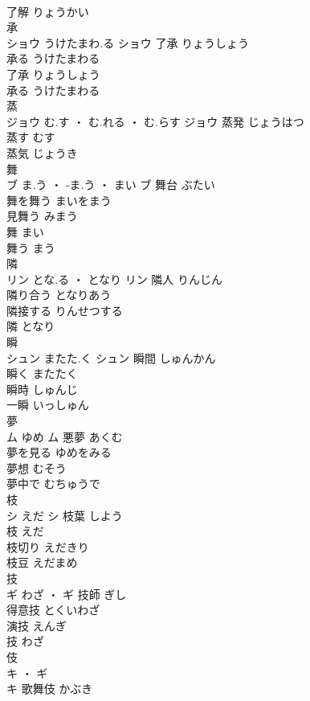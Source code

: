 \documentclass[8pt]{extreport}
\begin{document}
\begin{CJK}{UTF8}{min}
\\	了解	りょうかい	
\\	承	
\\	ショウ	うけたまわ.る	ショウ	了承	りょうしょう	
\\	承る	うけたまわる	
\\	了承	りょうしょう	
\\	承る	うけたまわる	
\\	蒸	
\\	ジョウ	む.す ・ む.れる ・ む.らす	ジョウ	蒸発	じょうはつ	
\\	蒸す	むす	
\\	蒸気	じょうき	
\\	舞	
\\	ブ	ま.う ・ -ま.う ・ まい	ブ	舞台	ぶたい	
\\	舞を舞う	まいをまう	
\\	見舞う	みまう	
\\	舞	まい	
\\	舞う	まう	
\\	隣	
\\	リン	とな.る ・ となり	リン	隣人	りんじん	
\\	隣り合う	となりあう	
\\	隣接する	りんせつする	
\\	隣	となり	
\\	瞬	
\\	シュン	またた.く	シュン	瞬間	しゅんかん	
\\	瞬く	またたく	
\\	瞬時	しゅんじ	
\\	一瞬	いっしゅん	
\\	夢	
\\	ム	ゆめ	ム	悪夢	あくむ	
\\	夢を見る	ゆめをみる	
\\	夢想	むそう	
\\	夢中で	むちゅうで	
\\	枝	
\\	シ	えだ	シ	枝葉	しよう	
\\	枝	えだ	
\\	枝切り	えだきり	
\\	枝豆	えだまめ	
\\	技	
\\	ギ	わざ ・	ギ	技師	ぎし	
\\	得意技	とくいわざ	
\\	演技	えんぎ	
\\	技	わざ	
\\	伎	
\\	キ ・ ギ
\\	キ	歌舞伎	かぶき	

\end{CJK}
\end{document}
